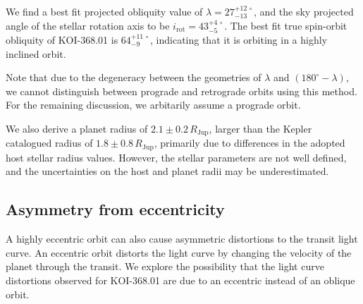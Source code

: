 \documentclass[iop]{emulateapj}
\begin{document}
We find a best fit projected obliquity value of $\lambda = 27_{-13}^{+12\,\circ}$, and the sky 
projected angle of the stellar rotation axis to be $i_\text{rot}=43_{-5}^{+4\, \circ}$. The best fit
true spin-orbit obliquity of KOI-368.01 is $64_{-9} ^{+11\,\circ}$, indicating 
that it is orbiting in a highly inclined orbit. 

Note that due to the degeneracy between the geometries of 
$\lambda$ and $(180^\circ - \lambda)$,  we cannot distinguish between prograde and retrograde
orbits using this method. For the remaining discussion, we arbitarily assume a
prograde orbit. 

We also derive a planet radius of $2.1\pm0.2\,R_\text{Jup}$, larger than the 
Kepler catalogued radius of $1.8\pm 0.8\, R_\text{Jup}$, primarily due to
differences in the adopted host stellar radius values. However, the stellar 
parameters are not well defined, and the uncertainties on the host and planet radii
may be underestimated.

\subsection{Asymmetry from eccentricity}
\label{sec:asymm-from-eccentr}

A highly eccentric orbit can also cause asymmetric distortions to the
transit light curve. An eccentric orbit distorts the light curve by
changing the velocity of the planet through the transit. We explore the
possibility that the light curve distortions observed for KOI-368.01
are due to an eccentric instead of an oblique orbit.
\end{document}

